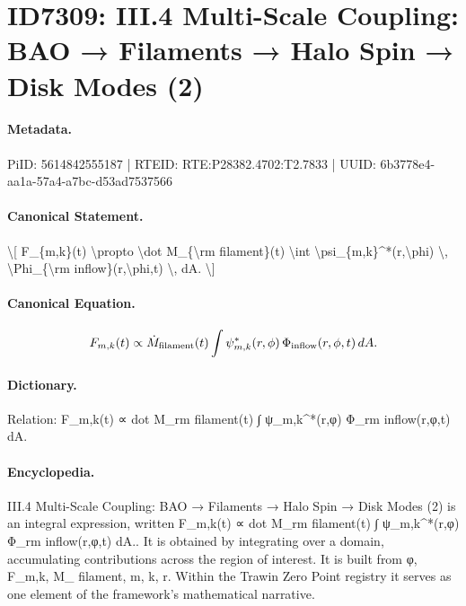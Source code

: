 \section*{ID7309: III.4 Multi-Scale Coupling: BAO → Filaments → Halo Spin → Disk Modes (2)}
\paragraph{Metadata.}
PiID: 5614842555187 | RTEID: RTE:P28382.4702:T2.7833 | UUID: 6b3778e4-aa1a-57a4-a7bc-d53ad7537566

\paragraph{Canonical Statement.}
\textbackslash{}[ F\_\{m,k\}(t) \textbackslash{}propto \textbackslash{}dot M\_\{\textbackslash{}rm filament\}(t) \textbackslash{}int \textbackslash{}psi\_\{m,k\}\textasciicircum{}*(r,\textbackslash{}phi) \textbackslash{}, \textbackslash{}Phi\_\{\textbackslash{}rm inflow\}(r,\textbackslash{}phi,t) \textbackslash{}, dA. \textbackslash{}]

\paragraph{Canonical Equation.}
\[
F_{m,k}(t) \propto \dot M_{\rm filament}(t) \int \psi_{m,k}^*(r,\phi) \, \Phi_{\rm inflow}(r,\phi,t) \, dA.
\]

\paragraph{Dictionary.}
Relation: F\_m,k(t) ∝ dot M\_rm filament(t) ∫ ψ\_m,k\textasciicircum{}*(r,φ) Φ\_rm inflow(r,φ,t) dA.

\paragraph{Encyclopedia.}
III.4 Multi-Scale Coupling: BAO → Filaments → Halo Spin → Disk Modes (2) is an integral expression, written F\_m,k(t) ∝ dot M\_rm filament(t) ∫ ψ\_m,k\textasciicircum{}*(r,φ) Φ\_rm inflow(r,φ,t) dA.. It is obtained by integrating over a domain, accumulating contributions across the region of interest. It is built from φ, F\_m,k, M\_ filament, m, k, r. Within the Trawin Zero Point registry it serves as one element of the framework's mathematical narrative.
